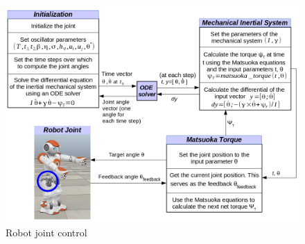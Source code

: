 \documentclass[12pt,twoside]{article}
\theoremstyle{plain}
\theoremstyle{definition}
\theoremstyle{remark}
\begin{document}
\begin{figure}[H]
\centering
\includegraphics[scale=0.45]{figures/robot_joint_control.png}
\caption{Robot joint control}
\label{fig:robot_joint_control}
\end{figure}
\end{document}
